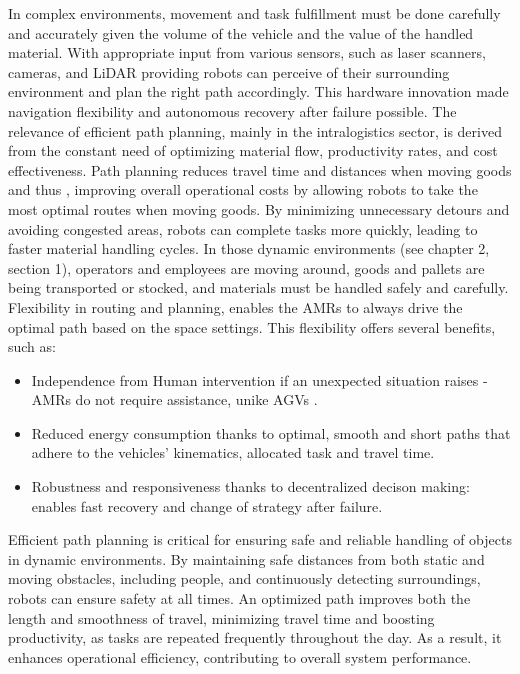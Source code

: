 In complex environments, movement and task fulfillment must be done carefully and accurately given 
the volume of the vehicle and the value of the handled material. With appropriate input from various sensors, 
such as laser 
scanners, cameras, and LiDAR providing robots can perceive of their surrounding environment and plan the right path
accordingly. This hardware innovation made navigation flexibility and autonomous recovery 
after failure possible\cite{R7}.
The relevance of efficient path planning, mainly in the intralogistics sector, is derived from the constant need 
of optimizing material flow, productivity rates, and cost effectiveness. Path planning reduces
travel time and distances when moving goods and thus , improving overall operational costs by allowing robots 
to take the most optimal routes when moving goods. By minimizing unnecessary detours and avoiding congested areas, 
robots can complete tasks more quickly, leading to faster material handling cycles.
In those dynamic environments (see chapter 2, section 1), operators and employees are moving around, 
goods and pallets are 
being transported or stocked, and materials must be handled safely and carefully.
Flexibility in routing and planning, enables the AMRs to always drive the optimal path
based on the space settings. This flexibility offers several benefits, such as:

\begin{itemize}
    \item Independence from Human intervention if an unexpected situation raises 
    -AMRs do not require assistance, unike AGVs \cite{R7}.
    \item Reduced energy consumption thanks to optimal, smooth and short paths that adhere to 
    the vehicles' kinematics, allocated task and travel time.
    \item Robustness and responsiveness thanks to decentralized decison making: enables fast 
    recovery and change of strategy after failure\cite{R7}.
\end{itemize}

Efficient path planning is critical for ensuring safe and reliable handling of objects in dynamic environments. 
By maintaining safe distances from both static and moving obstacles, including people, and continuously detecting 
surroundings, robots can ensure safety at all times. An optimized path improves both the length and 
smoothness of travel, minimizing travel time and boosting productivity, as tasks are repeated frequently 
throughout the day. As a result, it enhances operational efficiency, contributing to overall system 
performance.

